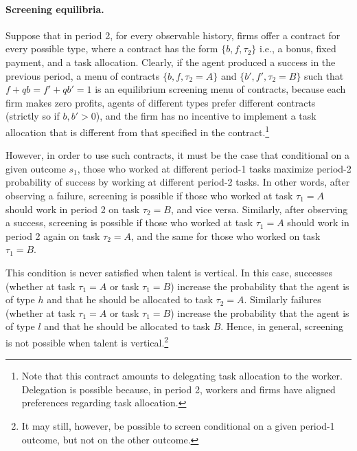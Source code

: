 \documentclass[12pt,american]{paper}
\theoremstyle{remark}
\begin{document}


\paragraph*{Screening equilibria.}

Suppose that in period 2, for every observable history,  firms offer a contract for every possible type, where a contract has the form $\{b,f,\tau_2\}$ i.e., a bonus, fixed payment, and a task allocation. Clearly, if the agent produced a success in the previous period, a menu of contracts $\{b,f,\tau_2=A\}$ and $\{b',f',\tau_2=B\}$ such that $f+qb=f'+qb'=1$ is an equilibrium screening menu of contracts, because each firm makes zero profits, agents of different types prefer different contracts (strictly so if $b,b'>0$), and the firm has no incentive to implement a task allocation that is different from that specified in the contract.\footnote{Note that this contract amounts to delegating task allocation to the worker. Delegation is possible because, in period 2, workers and firms have aligned preferences regarding task allocation.}

However, in order to use such contracts, it must be the case that conditional on a given outcome $s_1$, those who worked at different period-1 tasks maximize period-2 probability of success by working at different period-2 tasks. In other words, after observing a failure, screening is possible if those who worked at task $\tau_1=A$ should work in period 2 on task $\tau_2=B$, and vice versa. Similarly, after observing a success, screening is possible if those who worked at task $\tau_1=A$ should work in period 2 again on task $\tau_2=A$, and the same for those who worked on task $\tau_1=B$. 

This condition is never satisfied when talent is vertical. In this case, successes (whether at task $\tau_1=A$ or task $\tau_1=B$) increase the probability that the agent is of type $h$ and that he should be allocated to task $\tau_2=A$. Similarly failures (whether at task $\tau_1=A$ or task $\tau_1=B$) increase the probability that the agent is of type $l$ and that he should be allocated to task $B$. Hence, in general, screening is not possible when talent is vertical.\footnote{It may still, however, be possible to screen conditional on a given period-1 outcome, but not on the other outcome. }
\end{document}
